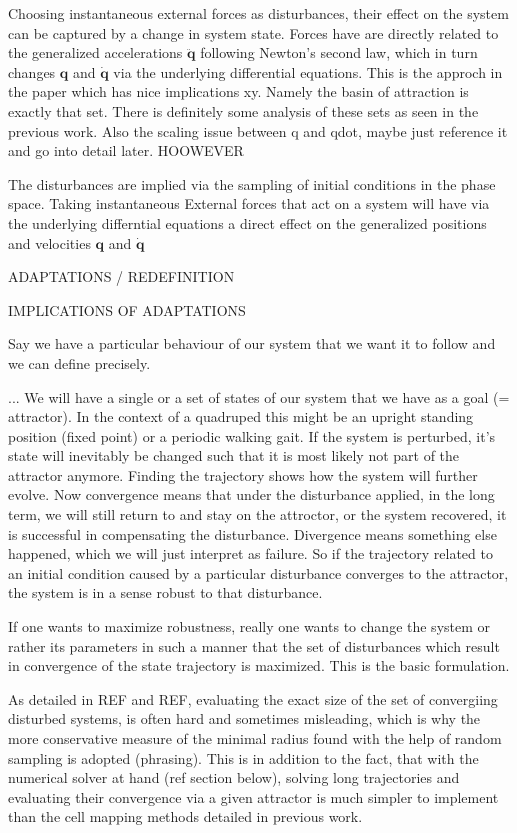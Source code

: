     Choosing instantaneous external forces as disturbances, their effect on the system can be captured by a change in system state. Forces have are directly related to the generalized accelerations $\ddot{\mathbf{q}}$ following Newton's second law, which in turn changes $\mathbf{q}$ and $\dot{\mathbf{q}}$ via the underlying differential equations.
    This is the approch in the paper which has nice implications xy. Namely the basin of attraction is exactly that set. There is definitely some analysis of these sets as seen in the previous work. 
    Also the scaling issue between q and qdot, maybe just reference it and go into detail later. 
    HOOWEVER


    The disturbances are implied via the sampling of initial conditions in the phase space. Taking instantaneous External forces that act on a system will have via the underlying differntial equations a direct effect on the generalized positions and velocities $\mathbf{q}$ and $\dot{\mathbf{q}}$

    ADAPTATIONS / REDEFINITION

    IMPLICATIONS OF ADAPTATIONS

    Say we have a particular behaviour of our system that we want it to follow and we can define precisely. 

    ...
    We will have a single or a set of states of our system that we have as a goal (= attractor). In the context of a quadruped this might be an upright standing position (fixed point) or a periodic walking gait. If the system is perturbed, it's state will inevitably be changed such that it is most likely not part of the attractor anymore. Finding the trajectory shows how the system will further evolve. Now convergence means that under the disturbance applied, in the long term, we will still return to and stay on the attroctor, or the system recovered, it is successful in compensating the disturbance. Divergence means something else happened, which we will just interpret as failure. So if the trajectory related to an initial condition caused by a particular disturbance converges to the attractor, the system is in a sense robust to that disturbance. 

    If one wants to maximize robustness, really one wants to change the system or rather its parameters in such a manner that the set of disturbances which result in convergence of the state trajectory is maximized. This is the basic formulation. 

    As detailed in REF and REF, evaluating the exact size of the set of convergiing disturbed systems, is often hard and sometimes misleading, which is why the more conservative measure of the minimal radius found with the help of random sampling is adopted (phrasing). This is in addition to the fact, that with the numerical solver at hand (ref section below), solving long trajectories and evaluating their convergence via a given attractor is much simpler to implement than the cell mapping methods detailed in previous work. 

